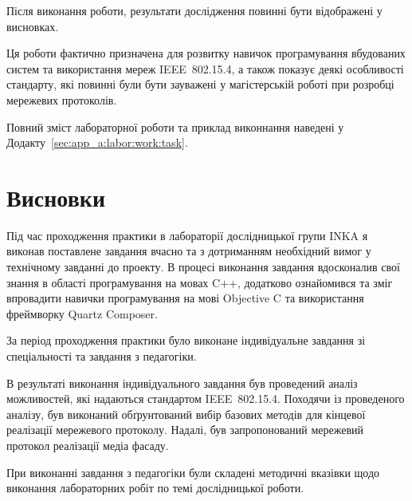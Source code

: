 \documentclass[a4paper,ukrainian,utf8,nocolumnsxix,floatsection]{eskdtext}
\let\stdsection\section
\renewcommand\section{\clearpage\stdsection}
\newcommand{\sectionnonum}[1]{\section*{#1}\addcontentsline{toc}{section}{#1}}
\newcommand{\iee}[0]{IEEE~802.15.4\xspace}
\begin{document}
Після виконання роботи, результати дослідження повинні бути відображені у висновках.

Ця роботи фактично призначена для розвитку навичок програмування вбудованих систем та використання мереж  \iee, а також показує деякі особливості стандарту, які повинні були бути зауважені у магістерській роботі при розробці мережевих протоколів.

Повний зміст лабораторної роботи та приклад виконнання наведені у Додакту~\ref{sec:app_a:labor:work:task}.


\sectionnonum{Висновки}

Під час проходження практики в лабораторії дослідницької групи INKA я виконав поставлене завдання вчасно та з дотриманням необхідний вимог у технічному завданні до проекту. В процесі виконання завдання вдосконалив свої знання в області програмування на мовах C++, додатково ознайомився та зміг впровадити навички програмування на мові Objective C та використання фреймворку Quartz Composer. 

За період проходження практики було виконане індивідуальне завдання зі спеціальності та завдання з педагогіки. 

В результаті виконання індивідуального завдання був проведений аналіз можливостей, які надаються стандартом \iee. Походячи із проведеного аналізу, був виконаний обґрунтований вибір базових методів для кінцевої реалізації мережевого протоколу. Надалі, був запропонований мережевий протокол реалізації медіа фасаду.

При виконанні завдання з педагогіки були складені методичні вказівки щодо виконання лабораторних робіт по темі дослідницької роботи. 

% 



\label{sec:app_a:labor:work:task}
\end{document}
